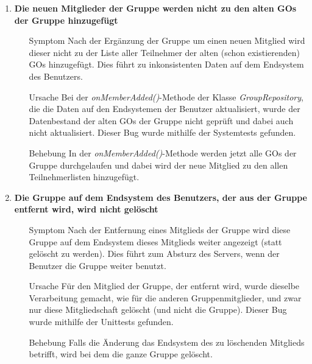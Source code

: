 \documentclass[11pt,a4paper]{scrartcl}
\def\threedigits#1{%
  \ifnum#1<100 0\fi
  \ifnum#1<10 0\fi
  \number#1}
\begin{document}
\begin{enumerate}[label={\textbf{/B\protect\threedigits{\theenumi}0/}}, leftmargin=*]
\item \textbf{Die neuen Mitglieder der Gruppe werden nicht zu den alten GOs der Gruppe hinzugefügt}
	\begin{itemize}
		\item[Symptom] Nach der Ergänzung der Gruppe um einen neuen Mitglied wird dieser nicht zu der Liste aller Teilnehmer der alten (schon existierenden) GOs hinzugefügt. Dies führt zu inkonsistenten Daten auf dem Endsystem des Benutzers.
		\item[Ursache] Bei der \textit{onMemberAdded()}-Methode der Klasse \textit{GroupRepository}, die die Daten auf den Endsystemen der Benutzer aktualisiert, wurde der Datenbestand der alten GOs der Gruppe nicht geprüft und dabei auch nicht aktualisiert. Dieser Bug wurde mithilfe der Systemtests gefunden.
		\item[Behebung] In der \textit{onMemberAdded()}-Methode werden jetzt alle GOs der Gruppe durchgelaufen und dabei wird der neue Mitglied zu den allen Teilnehmerlisten hinzugefügt.
	\end{itemize}
	
\item \textbf{Die Gruppe auf dem Endsystem des Benutzers, der aus der Gruppe entfernt wird, wird nicht gelöscht}
	\begin{itemize}
		\item[Symptom] Nach der Entfernung eines Mitglieds der Gruppe wird diese Gruppe auf dem Endsystem dieses Mitglieds weiter angezeigt (statt gelöscht zu werden). Dies führt zum Absturz des Servers, wenn der Benutzer die Gruppe weiter benutzt.
		\item[Ursache] Für den Mitglied der Gruppe, der entfernt wird, wurde dieselbe Verarbeitung gemacht, wie für die anderen Gruppenmitglieder, und zwar nur diese Mitgliedschaft gelöscht (und nicht die Gruppe). Dieser Bug wurde mithilfe der Unittests gefunden.
		\item[Behebung] Falls die Änderung das Endsystem des zu löschenden Mitglieds betrifft, wird bei dem die ganze Gruppe gelöscht.
	\end{itemize}
	

\end{enumerate}
\end{document}
